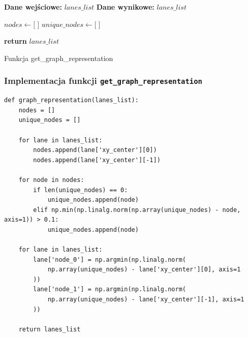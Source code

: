 \begin{pseudokod}[H]
    \SetAlgoLined
    \DontPrintSemicolon
    \textbf{Dane wejściowe:} $lanes\_list$\;
    \textbf{Dane wynikowe:} $lanes\_list$\;
    
    \BlankLine
    $nodes \leftarrow \lbrack\;\rbrack$\;
    $unique\_nodes \leftarrow \lbrack\;\rbrack$\;
    
    \BlankLine
    
    \BlankLine
    
    \BlankLine
    
    \BlankLine
    \textbf{return} $lanes\_list$

    \caption{Funkcja get\_graph\_representation}
\end{pseudokod}

\subsubsection{Implementacja funkcji \texttt{get\_graph\_representation}}

\begin{verbatim}
def graph_representation(lanes_list):
    nodes = []
    unique_nodes = []

    for lane in lanes_list:
        nodes.append(lane['xy_center'][0])
        nodes.append(lane['xy_center'][-1])

    for node in nodes:
        if len(unique_nodes) == 0:
            unique_nodes.append(node)
        elif np.min(np.linalg.norm(np.array(unique_nodes) - node, axis=1)) > 0.1:
            unique_nodes.append(node)

    for lane in lanes_list:
        lane['node_0'] = np.argmin(np.linalg.norm(
            np.array(unique_nodes) - lane['xy_center'][0], axis=1
        ))
        lane['node_1'] = np.argmin(np.linalg.norm(
            np.array(unique_nodes) - lane['xy_center'][-1], axis=1
        ))

    return lanes_list
\end{verbatim}

